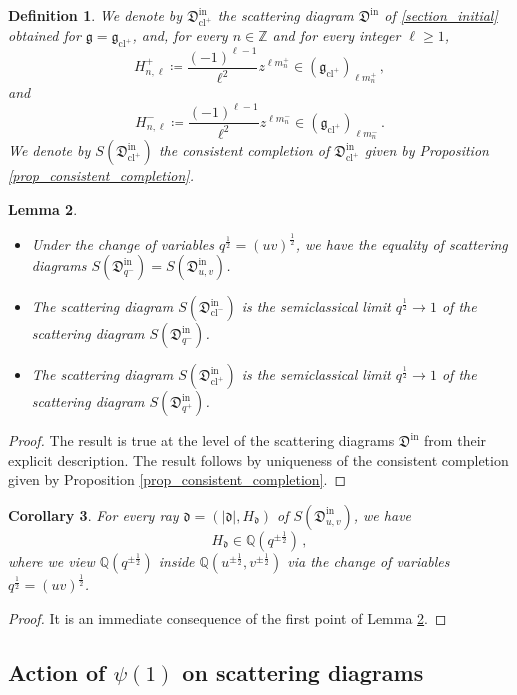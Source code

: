 \documentclass[12pt, a4paper]{amsart}
\newtheorem{defn}{Definition}[section]
\newtheorem{lem}[defn]{Lemma}
\newtheorem{cor}[defn]{Corollary}
\newcommand\Q{\mathbb Q}
\newcommand\Z{\mathbb Z}
\newcommand\fd{\mathfrak d}
\newcommand\fD{\mathfrak D}
\newcommand\fg{\mathfrak g}
\newcommand\cl{\operatorname{cl}}
\newcommand\iin{\mathrm{in}}
\begin{document}
\begin{defn}\label{defn_scattering_cl_+}
We denote by $\fD^\iin_{\cl^+}$ the scattering diagram $\fD^\iin$ of \cref{section_initial}
obtained for $\fg=\fg_{\cl^+}$, and, for every $n \in \Z$ and for every integer $\ell \geqslant 1$,
\[H_{n,\ell}^+ \coloneq \frac{(-1)^{\ell-1}}{\ell^2} z^{\ell m_n^+} \in (\fg_{\cl^+})_{\ell m_n^+}\,,\]
and 
\[H_{n,\ell}^- \coloneq \frac{(-1)^{\ell -1}}{\ell^2} z^{\ell m_n^-}\in (\fg_{\cl^+})_{\ell m_n^-}\,.\]
We denote by $S(\fD^\iin_{\cl^+})$ the consistent completion of $\fD^\iin_{\cl^+}$ given by 
Proposition \ref{prop_consistent_completion}.
\end{defn}

\begin{lem}\label{lem_q=uv}
\begin{itemize}
\item[(i)] Under the change of variables
$q^{\frac{1}{2}}=(uv)^{\frac{1}{2}}$, we have the equality of scattering diagrams
$S(\fD^\iin_{q^-})
=S(\fD^\iin_{u,v})$.
\item[(ii)] The scattering diagram $S(\fD^\iin_{\cl^-})$ is the semiclassical limit $q^{\frac{1}{2}} \rightarrow 1$ of the scattering diagram $S(\fD^\iin_{q^-})$.
\item[(iii)] The scattering diagram $S(\fD^\iin_{\cl^+})$ is the semiclassical
limit $q^{\frac{1}{2}} \rightarrow 1$ 
of the scattering diagram $S(\fD^\iin_{q^+})$.
\end{itemize}
\end{lem}


\begin{proof}
The result is true at the level of the scattering diagrams $\fD^\iin$ from
their explicit description.
The result follows by uniqueness of the consistent completion given by 
Proposition \ref{prop_consistent_completion}.
\end{proof}

\begin{cor} \label{cor_q_rationality}
For every ray $\fd=(|\fd|,H_\fd)$ of 
$S(\fD_{u,v}^\iin)$, we have 
\[ H_\fd \in \Q(q^{\pm \frac{1}{2}}) \,,\]
where we view $\Q(q^{\pm \frac{1}{2}})$
inside 
$\Q(u^{\pm \frac{1}{2}}, v^{\pm \frac{1}{2}})$ via the change of variables 
$q^{\frac{1}{2}}
=(uv)^{\frac{1}{2}}$.
\end{cor}

\begin{proof}
It is an immediate consequence of the first point of Lemma \ref{lem_q=uv}.
\end{proof}
\subsection{Action of $\psi(1)$ on scattering diagrams}
\label{subsection_psi(1)}
\end{document}
